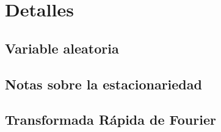 \chapter{Detalles}



\section{Variable aleatoria}



\section{Notas sobre la estacionariedad}


\section{Transformada R\'apida de Fourier}




